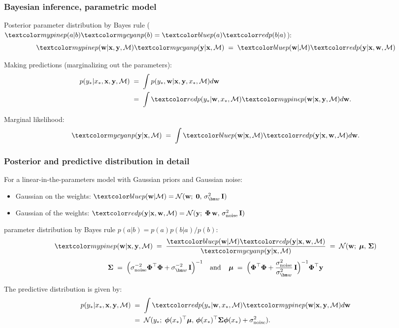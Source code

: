 \begin{frame}
\frametitle{Bayesian inference, parametric model}

Posterior parameter distribution by Bayes rule ($\Green{p(a|b)}\Cyan{p(b)}=\Blue{p(a)} \Red{p(b|a)}$):
\[
\Green{p(\bfw|\bfx,\bfy,\mathcal{M})}\Cyan{p(\bfy|\bfx,\mathcal{M})}
\;=\;\Blue{p(\bfw|\mathcal{M})}\Red{p(\bfy|\bfx,\bfw,\mathcal{M})}
\]

Making predictions (marginalizing out the parameters):
\[
\begin{split}
p(y_*|x_*,\bfx, \bfy,\mathcal{M})\;&=\;
\int p(y_*,\bfw|\bfx, \bfy, x_*, \mathcal{M})d\bfw\\
&=\;\int \Red{p(y_*|\bfw,x_*,\mathcal{M})}\Green{p(\bfw|\bfx,\bfy,\mathcal{M})}d\bfw.
\end{split}
\]

Marginal likelihood:
\[
\Cyan{p(\bfy|\bfx,\mathcal{M})}\;=\;
\int \Blue{p(\bfw|\bfx,\mathcal{M})}  \Red{p(\bfy|\bfx,\bfw,\mathcal{M})}  d\bfw.
\]
\end{frame}


\begin{frame}
\frametitle{Posterior and predictive distribution in detail}

For a linear-in-the-parameters model with Gaussian priors and Gaussian noise:
\begin{itemize}
\item Gaussian  on the weights: 
$\Blue{p(\bfw|\mathcal{M})}=\N(\bfw;\;\mathbf{0},\,\sigma_{\bm w}^2\,\bfI)$
\item Gaussian  of the weights:
$\Red{p(\bfy|\bfx,\bfw,\mathcal{M}})=\N(\bfy;\;\bPhi\,\bfw,\,\sigma_\mathrm{noise}^2\,\bfI)$
\end{itemize}

 parameter distribution by Bayes rule $p(a|b)=p(a)p(b|a)/p(b)$:
\[
\Green{p(\bfw|\bfx,\bfy,\mathcal{M})}\;=\;\frac{\Blue{p(\bfw|\mathcal{M})}
\Red{p(\bfy|\bfx,\bfw,\mathcal{M})}}{\Cyan{p(\bfy|\bfx,\mathcal{M})}}
\;=\; \N(\bfw;\;\bmu,\,\bSigma)
\]
\[
\bSigma\;=\;\left(\sigma_\mathrm{noise}^{-2}\bPhi^\top\bPhi+\sigma_{\bm
    w}^{-2}\,\bfI\right)^{-1}
\mathrm{\; \; \; and \; \; \; \; }
\bmu\;=\;
\Big(\bPhi^\top\bPhi+\frac{\sigma_\mathrm{noise}^2}{\sigma_{\bm w}^2}\,\bfI\Big)^{-1}\bPhi^\top\bfy
\]

The predictive distribution is given by:
\[
\begin{split}
p(y_*|x_*,\bfx, \bfy,\mathcal{M})\;&=\;\int
\Red{p(y_*|\bfw,x_*,\mathcal{M})}\Green{p(\bfw|\bfx, \bfy,\mathcal{M})}d\bfw\\
&=\;\N(y_*;\; \bphi(x_*)^\top\bmu,\,\bphi(x_*)^\top\bSigma\bphi(x_*)+\sigma_\mathrm{noise}^2).
\end{split}
\]
\end{frame}


